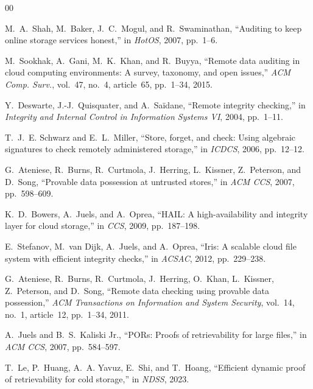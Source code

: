 \documentclass[lettersize,journal]{IEEEtran}
\begin{document}
\begin{thebibliography}{00}


M.~A.~Shah, M.~Baker, J.~C.~Mogul, and R.~Swaminathan,
``Auditing to keep online storage services honest,''
in \emph{HotOS}, 2007, pp.~1--6.

M.~Sookhak, A.~Gani, M.~K.~Khan, and R.~Buyya,
``Remote data auditing in cloud computing environments: A survey, taxonomy, and open issues,''
\emph{ACM Comp. Surv.}, vol.~47, no.~4, article~65, pp.~1--34, 2015.

Y.~Deswarte, J.-J.~Quisquater, and A.~Sa{\"i}dane,
``Remote integrity checking,''
in \emph{Integrity and Internal Control in Information Systems VI}, 2004, pp.~1--11.

T.~J.~E. Schwarz and E.~L.~Miller,
``Store, forget, and check: Using algebraic signatures to check remotely administered storage,''
in \emph{ICDCS}, 2006, pp.~12--12.

G.~Ateniese, R.~Burns, R.~Curtmola, J.~Herring, L.~Kissner, Z.~Peterson, and D.~Song,
``Provable data possession at untrusted stores,''
in \emph{ACM CCS}, 2007, pp.~598--609.

K.~D.~Bowers, A.~Juels, and A.~Oprea,
``HAIL: A high-availability and integrity layer for cloud storage,''
in \emph{CCS}, 2009, pp.~187--198.

E.~Stefanov, M.~van Dijk, A.~Juels, and A.~Oprea,
``Iris: A scalable cloud file system with efficient integrity checks,''
in \emph{ACSAC}, 2012, pp.~229--238.

G.~Ateniese, R.~Burns, R.~Curtmola, J.~Herring, O.~Khan, L.~Kissner, Z.~Peterson, and D.~Song,
``Remote data checking using provable data possession,''
\emph{ACM Transactions on Information and System Security}, vol.~14, no.~1, article~12, pp.~1--34, 2011.


A.~Juels and B.~S.~Kaliski Jr.,
``PORs: Proofs of retrievability for large files,''
in \emph{ACM CCS}, 2007, pp.~584--597.

T.~Le, P.~Huang, A.~A. Yavuz, E.~Shi, and T.~Hoang,
``Efficient dynamic proof of retrievability for cold storage,''
in \emph{NDSS}, 2023.


\end{thebibliography}
\end{document}
